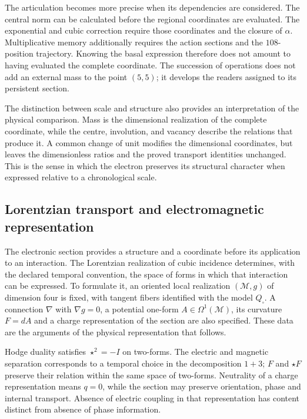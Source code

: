 The articulation becomes more precise when its dependencies are considered.
The central norm can be calculated before the regional coordinates
are evaluated. The exponential and cubic correction require those
coordinates and the closure of \(\alpha\). Multiplicative memory additionally
requires the action sections and the \(108\)-position trajectory.
Knowing the basal expression therefore does not amount to having evaluated
the complete coordinate. The succession of operations does not add an
external mass to the point \((5,5)\); it develops the readers assigned to its
persistent section.

The distinction between scale and structure also provides an
interpretation of the physical comparison. Mass is the dimensional
realization of the complete coordinate, while the centre, involution,
and vacancy describe the relations that produce it. A common change
of unit modifies the dimensional coordinates, but leaves the dimensionless
ratios and the proved transport identities unchanged.
This is the sense in which the electron preserves its structural character
when expressed relative to a chronological scale.




\newpage
\subsection{Lorentzian transport and electromagnetic representation}

The electronic section provides a structure and a coordinate
before its application to an interaction. The Lorentzian realization
of cubic incidence determines, with the declared temporal convention,
the space of forms in which that interaction can be expressed.
To formulate it, an oriented local realization \((\mathcal M,g)\)
of dimension four is fixed, with tangent fibers identified with the model
\(Q_\square\). A connection \(\nabla\) with
\(\nabla g=0\), a potential one-form \(A\in\Omega^1(\mathcal M)\),
its curvature \(F=dA\) and a charge representation of the section are also specified.
These data are the arguments of the physical representation that follows.

Hodge duality satisfies \(\star^2=-I\) on two-forms.
The electric and magnetic separation corresponds to a temporal choice
in the decomposition \(1+3\); \(F\) and \(\star F\) preserve their
relation within the same space of two-forms. Neutrality of a
charge representation means \(q=0\), while the section may
preserve orientation, phase and internal transport. Absence of
electric coupling in that representation has content distinct
from absence of phase information.

